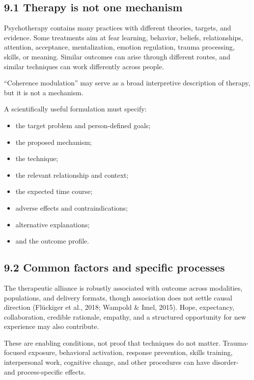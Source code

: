\documentclass[
  11pt,
]{article}
\providecommand{\tightlist}{%
  \setlength{\itemsep}{0pt}\setlength{\parskip}{0pt}}
\begin{document}
\subsection{9.1 Therapy is not one
mechanism}\label{therapy-is-not-one-mechanism}

Psychotherapy contains many practices with different theories, targets,
and evidence. Some treatments aim at fear learning, behavior, beliefs,
relationships, attention, acceptance, mentalization, emotion regulation,
trauma processing, skills, or meaning. Similar outcomes can arise
through different routes, and similar techniques can work differently
across people.

``Coherence modulation'' may serve as a broad interpretive description
of therapy, but it is not a mechanism.

A scientifically useful formulation must specify:

\begin{itemize}
\tightlist
\item
  the target problem and person-defined goals;
\item
  the proposed mechanism;
\item
  the technique;
\item
  the relevant relationship and context;
\item
  the expected time course;
\item
  adverse effects and contraindications;
\item
  alternative explanations;
\item
  and the outcome profile.
\end{itemize}

\subsection{9.2 Common factors and specific
processes}\label{common-factors-and-specific-processes}

The therapeutic alliance is robustly associated with outcome across
modalities, populations, and delivery formats, though association does
not settle causal direction (Flückiger et al., 2018; Wampold \& Imel,
2015). Hope, expectancy, collaboration, credible rationale, empathy, and
a structured opportunity for new experience may also contribute.

These are enabling conditions, not proof that techniques do not matter.
Trauma-focused exposure, behavioral activation, response prevention,
skills training, interpersonal work, cognitive change, and other
procedures can have disorder- and process-specific effects.
\end{document}
